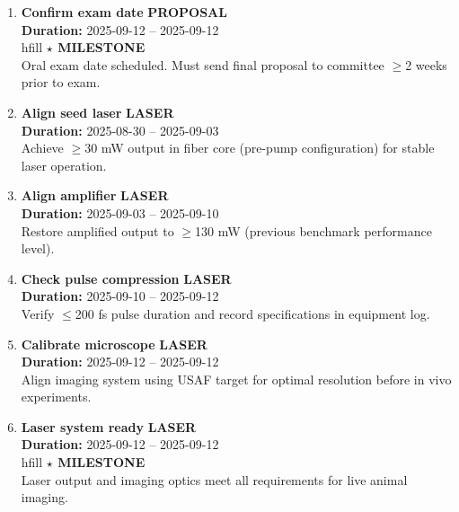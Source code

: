 \documentclass[a4paper]{article}
\newcommand{\cellcolor}[2]{\colorbox{#1}{#2}}
\begin{document}
\begin{enumerate}[leftmargin=0.3cm, itemsep=0.3em, parsep=0.1em, topsep=0.1em]
    \item \textcolor{researchcore}{\textbf{\Large Confirm exam date}}
          \hfill \cellcolor{researchcore!15}{\textbf{\small PROPOSAL}}
          \\ \textcolor{black!60}{\textbf{Duration:} 2025-09-12 -- 2025-09-12} \\hfill \textcolor{milestone}{\textbf{$\star$ MILESTONE}} \\ \textcolor{black!80}{\small Oral exam date scheduled. Must send final proposal to committee $\geq$2 weeks prior to exam.}

    \item \textcolor{researchexp}{\textbf{\Large Align seed laser}}
          \hfill \cellcolor{researchexp!15}{\textbf{\small LASER}}
          \\ \textcolor{black!60}{\textbf{Duration:} 2025-08-30 -- 2025-09-03} \\ \textcolor{black!80}{\small Achieve $\geq$30 mW output in fiber core (pre-pump configuration) for stable laser operation.}

    \item \textcolor{researchexp}{\textbf{\Large Align amplifier}}
          \hfill \cellcolor{researchexp!15}{\textbf{\small LASER}}
          \\ \textcolor{black!60}{\textbf{Duration:} 2025-09-03 -- 2025-09-10} \\ \textcolor{black!80}{\small Restore amplified output to $\geq$130 mW (previous benchmark performance level).}

    \item \textcolor{researchexp}{\textbf{\Large Check pulse compression}}
          \hfill \cellcolor{researchexp!15}{\textbf{\small LASER}}
          \\ \textcolor{black!60}{\textbf{Duration:} 2025-09-10 -- 2025-09-12} \\ \textcolor{black!80}{\small Verify $\leq$200 fs pulse duration and record specifications in equipment log.}

    \item \textcolor{researchexp}{\textbf{\Large Calibrate microscope}}
          \hfill \cellcolor{researchexp!15}{\textbf{\small LASER}}
          \\ \textcolor{black!60}{\textbf{Duration:} 2025-09-12 -- 2025-09-12} \\ \textcolor{black!80}{\small Align imaging system using USAF target for optimal resolution before in vivo experiments.}

    \item \textcolor{researchexp}{\textbf{\Large Laser system ready}}
          \hfill \cellcolor{researchexp!15}{\textbf{\small LASER}}
          \\ \textcolor{black!60}{\textbf{Duration:} 2025-09-12 -- 2025-09-12} \\hfill \textcolor{milestone}{\textbf{$\star$ MILESTONE}} \\ \textcolor{black!80}{\small Laser output and imaging optics meet all requirements for live animal imaging.}


\end{enumerate}
\end{document}
